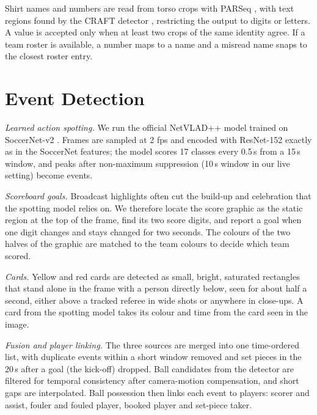 \documentclass[conference]{IEEEtran}
\begin{document}
Shirt names and numbers are read from torso crops with PARSeq \cite{bautista2022scene}, with text regions found by the CRAFT detector \cite{baek2019character}, restricting the output to digits or letters. A value is accepted only when at least two crops of the same identity agree. If a team roster is available, a number maps to a name and a misread name snaps to the closest roster entry.

\section{Event Detection}
\label{sec:events}

\textit{Learned action spotting.} We run the official NetVLAD++ model \cite{giancola2021temporally} trained on SoccerNet-v2 \cite{deliege2021soccernet}. Frames are sampled at 2 fps and encoded with ResNet-152 \cite{he2016deep} exactly as in the SoccerNet features; the model scores 17 classes every 0.5\,s from a 15\,s window, and peaks after non-maximum suppression (10\,s window in our live setting) become events.

\textit{Scoreboard goals.} Broadcast highlights often cut the build-up and celebration that the spotting model relies on. We therefore locate the score graphic as the static region at the top of the frame, find its two score digits, and report a goal when one digit changes and stays changed for two seconds. The colours of the two halves of the graphic are matched to the team colours to decide which team scored.

\textit{Cards.} Yellow and red cards are detected as small, bright, saturated rectangles that stand alone in the frame with a person directly below, seen for about half a second, either above a tracked referee in wide shots or anywhere in close-ups. A card from the spotting model takes its colour and time from the card seen in the image.

\textit{Fusion and player linking.} The three sources are merged into one time-ordered list, with duplicate events within a short window removed and set pieces in the 20\,s after a goal (the kick-off) dropped. Ball candidates from the detector are filtered for temporal consistency after camera-motion compensation, and short gaps are interpolated. Ball possession then links each event to players: scorer and assist, fouler and fouled player, booked player and set-piece taker.

\end{document}
